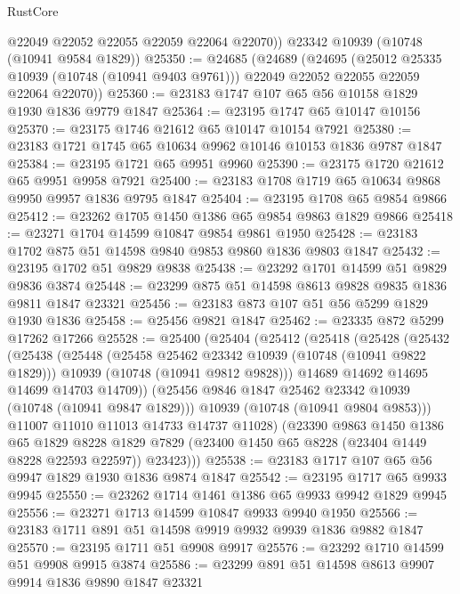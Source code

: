 \begin{lexlean}{RustCore}
\begin{coremodule}
        @22049
        @22052
        @22055
        @22059
        @22064
        @22070))
    @23342
    @10939
    (@10748 (@10941 @9584 @1829))
@25350 := @24685
    (@24689
      (@24695
        (@25012 @25335 @10939 (@10748 (@10941 @9403 @9761)))
        @22049
        @22052
        @22055
        @22059
        @22064
        @22070))
@25360 := @23183 @1747 @107 @65 @56 @10158 @1829 @1930 @1836 @9779 @1847
@25364 := @23195 @1747 @65 @10147 @10156
@25370 := @23175 @1746 @21612 @65 @10147 @10154 @7921
@25380 := @23183 @1721 @1745 @65 @10634 @9962 @10146 @10153 @1836 @9787 @1847
@25384 := @23195 @1721 @65 @9951 @9960
@25390 := @23175 @1720 @21612 @65 @9951 @9958 @7921
@25400 := @23183 @1708 @1719 @65 @10634 @9868 @9950 @9957 @1836 @9795 @1847
@25404 := @23195 @1708 @65 @9854 @9866
@25412 := @23262 @1705 @1450 @1386 @65 @9854 @9863 @1829 @9866
@25418 := @23271 @1704 @14599 @10847 @9854 @9861 @1950
@25428 := @23183 @1702 @875 @51 @14598 @9840 @9853 @9860 @1836 @9803 @1847
@25432 := @23195 @1702 @51 @9829 @9838
@25438 := @23292 @1701 @14599 @51 @9829 @9836 @3874
@25448 := @23299 @875 @51 @14598 @8613 @9828 @9835 @1836 @9811 @1847 @23321
@25456 := @23183 @873 @107 @51 @56 @5299 @1829 @1930 @1836
@25458 := @25456 @9821 @1847
@25462 := @23335 @872 @5299 @17262 @17266
@25528 := @25400
    (@25404
      (@25412
        (@25418
          (@25428
            (@25432
              (@25438
                (@25448
                  (@25458 @25462 @23342 @10939 (@10748 (@10941 @9822 @1829)))
                  @10939
                  (@10748 (@10941 @9812 @9828)))
                @14689
                @14692
                @14695
                @14699
                @14703
                @14709))
            (@25456 @9846 @1847 @25462 @23342 @10939 (@10748 (@10941 @9847 @1829)))
            @10939
            (@10748 (@10941 @9804 @9853)))
          @11007
          @11010
          @11013
          @14733
          @14737
          @11028)
        (@23390
          @9863
          @1450
          @1386
          @65
          @1829
          @8228
          @1829
          @7829
          (@23400 @1450 @65 @8228 (@23404 @1449 @8228 @22593 @22597))
          @23423)))
@25538 := @23183 @1717 @107 @65 @56 @9947 @1829 @1930 @1836 @9874 @1847
@25542 := @23195 @1717 @65 @9933 @9945
@25550 := @23262 @1714 @1461 @1386 @65 @9933 @9942 @1829 @9945
@25556 := @23271 @1713 @14599 @10847 @9933 @9940 @1950
@25566 := @23183 @1711 @891 @51 @14598 @9919 @9932 @9939 @1836 @9882 @1847
@25570 := @23195 @1711 @51 @9908 @9917
@25576 := @23292 @1710 @14599 @51 @9908 @9915 @3874
@25586 := @23299 @891 @51 @14598 @8613 @9907 @9914 @1836 @9890 @1847 @23321

\end{coremodule}
\end{lexlean}

